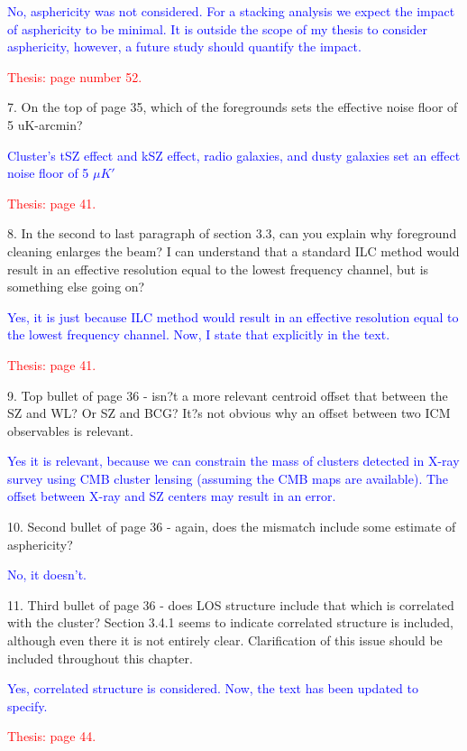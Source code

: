 \documentclass[11pt,a4paper]{article}
\begin{document}
\textcolor{blue}{No, asphericity was not considered. For a stacking analysis we expect the impact of asphericity to be minimal. It is outside the scope of my thesis to consider asphericity, however, a future study should quantify the impact.}

\textcolor{red}{Thesis: page number 52.}


7. On the top of page 35, which of the foregrounds sets the effective noise floor of 5
uK-arcmin?

\textcolor{blue}{Cluster's tSZ effect and kSZ effect, radio galaxies, and dusty galaxies set an effect noise floor of 5 $\mu K'$}
 
 \textcolor{red}{Thesis: page 41.}
 
 8. In the second to last paragraph of section 3.3, can you explain why foreground
cleaning enlarges the beam? I can understand that a standard ILC method would
result in an effective resolution equal to the lowest frequency channel, but is
something else going on?
 
 \textcolor{blue}{Yes, it is just because ILC method would result in an effective resolution equal to the lowest frequency channel. Now, I state that explicitly in the text.}
 
 \textcolor{red}{Thesis: page 41.}
 
 9. Top bullet of page 36 - isn?t a more relevant centroid offset that between the SZ
and WL? Or SZ and BCG? It?s not obvious why an offset between two ICM
observables is relevant.
 
 \textcolor{blue}{Yes it is relevant, because we can constrain the mass of clusters detected in X-ray survey using CMB cluster lensing (assuming the CMB maps are available). The offset between X-ray and SZ centers may result in an error.}
 
10. Second bullet of page 36 - again, does the mismatch include some estimate of
asphericity?

\textcolor{blue}{No, it doesn't.}

11. Third bullet of page 36 - does LOS structure include that which is correlated with
the cluster? Section 3.4.1 seems to indicate correlated structure is included,
although even there it is not entirely clear. Clarification of this issue should be
included throughout this chapter.

\textcolor{blue}{Yes, correlated structure is considered. Now, the text has been updated to specify.}

\textcolor{red}{Thesis: page 44.}
\end{document}
